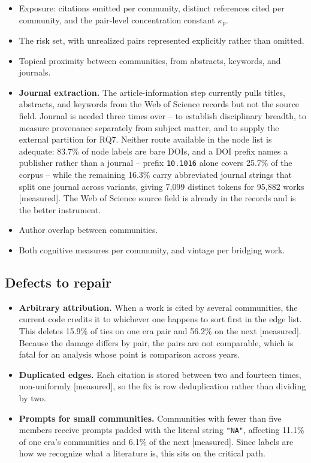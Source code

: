 \documentclass[11pt]{article}
\newcommand{\meas}{{\footnotesize\textsf{[measured]}}}
\newcommand{\code}[1]{\texttt{\small #1}}
\begin{document}
\begin{itemize}[leftmargin=2em, itemsep=1pt]
  \item Exposure: citations emitted per community, distinct references cited per community,
        and the pair-level concentration constant $\kappa_p$.
  \item The risk set, with unrealized pairs represented explicitly rather than omitted.
  \item Topical proximity between communities, from abstracts, keywords, and journals.
  \item \textbf{Journal extraction.} The article-information step currently pulls titles,
        abstracts, and keywords from the Web of Science records but not the source field.
        Journal is needed three times over -- to establish disciplinary breadth, to measure
        provenance separately from subject matter, and to supply the external partition for
        RQ7. Neither route available in the node list is adequate: 83.7\% of node labels
        are bare DOIs, and a DOI prefix names a publisher rather than a journal -- prefix
        \code{10.1016} alone covers 25.7\% of the corpus -- while the remaining 16.3\%
        carry abbreviated journal strings that split one journal across variants, giving
        7{,}099 distinct tokens for 95{,}882 works \meas{}. The Web of Science source
        field is already in the records and is the better instrument.
  \item Author overlap between communities.
  \item Both cognitive measures per community, and vintage per bridging work.
\end{itemize}

\subsection{Defects to repair}

\begin{itemize}[leftmargin=2em, itemsep=1pt]
  \item \textbf{Arbitrary attribution.} When a work is cited by several communities, the
        current code credits it to whichever one happens to sort first in the edge list. This
        deletes 15.9\% of ties on one era pair and 56.2\% on the next \meas{}. Because the
        damage differs by pair, the pairs are not comparable, which is fatal for an analysis
        whose point is comparison across years.
  \item \textbf{Duplicated edges.} Each citation is stored between two and fourteen times,
        non-uniformly \meas{}, so the fix is row deduplication rather than dividing by two.
  \item \textbf{Prompts for small communities.} Communities with fewer than five members
        receive prompts padded with the literal string \code{"NA"}, affecting 11.1\% of one
        era's communities and 6.1\% of the next \meas{}. Since labels are how we recognize
        what a literature is, this sits on the critical path.
\end{itemize}
\end{document}
